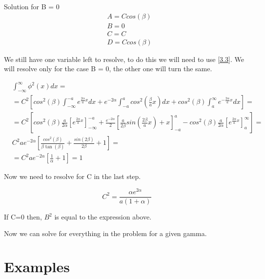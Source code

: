 Solution for B = 0
\begin{equation}
     \begin{split}
        & A = C cos(\beta)
        \\
        & B = 0
        \\
        & C = C
        \\
        & D = C cos(\beta)
     \end{split}
\end{equation}



We still have one variable left to resolve, to do this we will need to use \ref{3.3}. We will resolve only for the case B = 0, the other one will turn the same.

\begin{equation}
    \label{3.29}
    \begin{split}
        & \int_{-\infty}^{\infty} \phi^2(x) dx = 
        \\
        & = C^2\left[ cos^2(\beta) \int_{-\infty}^{-a}e^{\frac{2\alpha}{a}x}dx + e^{-2\alpha}\int_{-a}^{a} cos^2(\frac{\beta}{a}x) dx + cos^2(\beta) \int_{a}^{\infty}e^{-\frac{2\alpha}{a}x}dx \right]=
        \\
        & =  C^2\left[ cos^2(\beta)\frac{a}{2\alpha} \left[e^{\frac{2\alpha}{a}x}\right]_{-\infty}^{-a} 
        + \frac{e^{-2\alpha}}{2} \left[\frac{a}{2\beta}sin(\frac{2\beta}{a}x)+x\right]_{-a}^{a} 
        - cos^2(\beta) \frac{a}{2\alpha} \left[e^{\frac{2\alpha}{a}x}\right]_{a}^{\infty} \right] =
        \\
        & C^2 a e^{-2\alpha}\left[\frac{cos^2(\beta)}{\beta\tan{(\beta)}}+\frac{sin(2\beta)}{2\beta}+1\right] =
        \\
        & = C^2ae^{-2\alpha}\left[\frac{1}{\alpha}+1\right] = 1
    \end{split}
\end{equation}

Now we need to resolve for C in the last step.

\begin{equation}
    \label{3.30}
    C^2 = \frac{\alpha e^{2\alpha}}{a(1+\alpha)}
\end{equation}

If C=0 then, $B^2$ is equal to the expression above. 

Now we can solve for everything in the problem for a given gamma.


\section{Examples}

